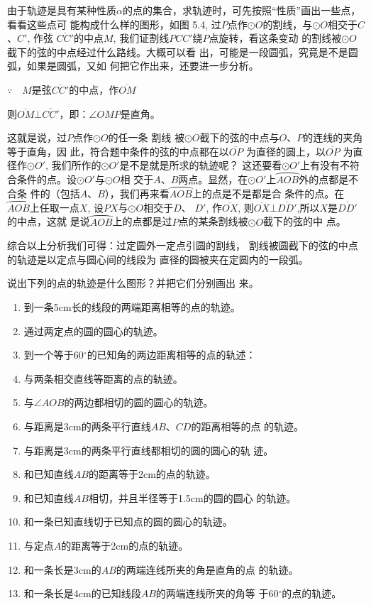 \begin{solution}
    由于轨迹是具有某种性质$\alpha$的点的集合，求轨迹时，可先按照“性质”画出一些点，看看这些点可
能构成什么样的图形，如图
5.4, 过$P$点作$\odot O$的割线，与$\odot O$相交于$C$、$C'$, 作弦
$\overline{CC'}$的中点$M$, 我们证割线$PCC'$绕$P$点旋转，看这条变动
的割线被$\odot O$截下的弦的中点经过什么路线。大概可以看
出，可能是一段圆弧，究竟是不是圆弧，如果是圆弧，又如
何把它作出来，还要进一步分析。

$\because\quad M$是弦$\overline{CC'}$的中点，作$\overline{OM}$

则$\overline{OM}\bot\overline{CC'}$，即：$\angle OMP$是直角。

这就是说，过$P$点作$\odot O$的任一条 割线
被$\odot O$截下的弦的中点与$O$、$P$的连线的夹角等于直角，因
此，符合题中条件的弦的中点都在以$\overline{OP}$
为直径的圆上，以$\overline{OP}$
为直径作$\odot O'$, 我们所作的$\odot O'$是不是就是所求的轨迹呢？
这还要看$\odot O'$上有没有不符合条件的点。设$\odot O'$与$\odot O$相
交于$A$、$B$两点。显然，在$\odot O'$上$\wideparen{AOB}$外的点都是不合条
件的（包括$A$、$B$），我们再来看$\wideparen{AOB}$上的点是不是都是合
条件的点。在
$\wideparen{AOB}$上任取一点$X$, 设$PX$与$\odot O$相交于$D$、
$D'$, 作$\overline{OX}$, 则$\overline{OX}\bot \overline{DD'}$,所以$X$是$\overline{DD'}$的中点，这就
是说$\wideparen{AOB}$上的点都是过$P$点的某条割线被$\odot O$截下的弦的中
点。
\end{solution}

综合以上分析我们可得：过定圆外一定点引圆的割线，
割线被圆截下的弦的中点的轨迹是以定点与圆心间的线段为
直径的圆被夹在定圆内的一段弧。

\begin{ex}
    说出下列的点的轨迹是什么图形？并把它们分别画出
来。
\begin{enumerate}
    \item 到一条5cm长的线段的两端距离相等的点的轨迹。
    \item 通过两定点的圆的圆心的轨迹。
    \item 到一个等于60$^{\circ}$的已知角的两边距离相等的点的轨述：
    \item 与两条相交直线等距离的点的轨迹。
    \item 与$\angle AOB$的两边都相切的圆的圆心的轨迹。
    \item 与距离是3cm的两条平行直线$AB$、$CD$的距离相等的点
的轨迹。
\item 与距离是3cm的两条平行直线都相切的圆的圆心的轨
迹。
\item 和已知直线$AB$的距离等于2cm的点的轨迹。
\item 和已知直线$AB$相切，并且半径等于1.5cm的圆的圆心
的轨迹。
   \item 和一条已知直线切于已知点的圆的圆心的轨迹。
\item 与定点$A$的距离等于2cm的点的轨迹。
\item 和一条长是3cm的$AB$的两端连线所夹的角是直角的点
的轨迹。
\item 和一条长是4cm的已知线段$AB$的两端连线所夹的角等
于60$^{\circ}$的点的轨迹。

\end{enumerate}
\end{ex}


